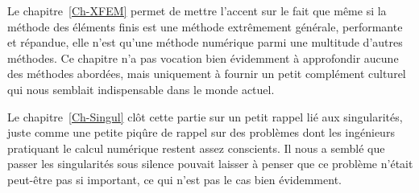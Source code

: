 \medskip
Le chapitre~\ref{Ch-XFEM} permet de mettre l'accent sur le fait que même si la méthode des éléments finis est une méthode extrêmement générale, performante et répandue, elle n'est qu'une méthode numérique parmi une multitude d'autres méthodes.
Ce chapitre n'a pas vocation bien évidemment à approfondir aucune des méthodes abordées, mais uniquement à fournir un petit complément culturel qui nous semblait indispensable dans le monde actuel.

\medskip
Le chapitre~\ref{Ch-Singul} clôt cette partie sur un petit rappel lié aux singularités, juste comme une petite piqûre de rappel sur des problèmes dont les ingénieurs pratiquant le calcul numérique restent assez conscients. Il nous a semblé que passer les singularités sous silence pouvait laisser à penser que ce problème n'était peut-être pas si important, ce qui n'est pas le cas bien évidemment.





